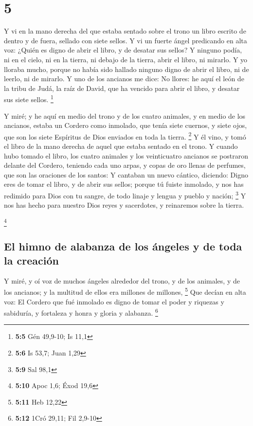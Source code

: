 \hypertarget{section-4}{%
\section{5}\label{section-4}}

 Y vi en la mano derecha del que estaba sentado sobre el
trono un libro escrito de dentro y de fuera, sellado con siete sellos.
 Y vi un fuerte ángel predicando en alta voz: ¿Quién es
digno de abrir el libro, y de desatar sus sellos?  Y
ninguno podía, ni en el cielo, ni en la tierra, ni debajo de la tierra,
abrir el libro, ni mirarlo.  Y yo lloraba mucho, porque no
había sido hallado ninguno digno de abrir el libro, ni de leerlo, ni de
mirarlo.  Y uno de los ancianos me dice: No llores: he
aquí el león de la tribu de Judá, la raíz de David, que ha vencido para
abrir el libro, y desatar sus siete sellos. \footnote{\textbf{5:5} Gén
  49,9-10; Is 11,1}

 Y miré; y he aquí en medio del trono y de los cuatro
animales, y en medio de los ancianos, estaba un Cordero como inmolado,
que tenía siete cuernos, y siete ojos, que son los siete Espíritus de
Dios enviados en toda la tierra. \footnote{\textbf{5:6} Is 53,7; Juan
  1,29}  Y él vino, y tomó el libro de la mano derecha de
aquel que estaba sentado en el trono.  Y cuando hubo
tomado el libro, los cuatro animales y los veinticuatro ancianos se
postraron delante del Cordero, teniendo cada uno arpas, y copas de oro
llenas de perfumes, que son las oraciones de los santos: 
Y cantaban un nuevo cántico, diciendo: Digno eres de tomar el libro, y
de abrir sus sellos; porque tú fuiste inmolado, y nos has redimido para
Dios con tu sangre, de todo linaje y lengua y pueblo y nación;
\footnote{\textbf{5:9} Sal 98,1}  Y nos has hecho para
nuestro Dios reyes y sacerdotes, y reinaremos sobre la tierra.

\footnote{\textbf{5:10} Apoc 1,6; Éxod 19,6}

\hypertarget{el-himno-de-alabanza-de-los-uxe1ngeles-y-de-toda-la-creaciuxf3n}{%
\subsection{El himno de alabanza de los ángeles y de toda la
creación}\label{el-himno-de-alabanza-de-los-uxe1ngeles-y-de-toda-la-creaciuxf3n}}

 Y miré, y oí voz de muchos ángeles alrededor del trono,
y de los animales, y de los ancianos; y la multitud de ellos era
millones de millones, \footnote{\textbf{5:11} Heb 12,22} 
Que decían en alta voz: El Cordero que fué inmolado es digno de tomar el
poder y riquezas y sabiduría, y fortaleza y honra y gloria y alabanza.
\footnote{\textbf{5:12} 1Cró 29,11; Fil 2,9-10}

